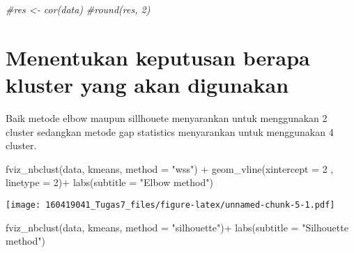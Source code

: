 \documentclass[
]{article}
\newenvironment{Shaded}{\begin{snugshade}}{\end{snugshade}}
\newcommand{\AttributeTok}[1]{\textcolor[rgb]{0.77,0.63,0.00}{#1}}
\newcommand{\CommentTok}[1]{\textcolor[rgb]{0.56,0.35,0.01}{\textit{#1}}}
\newcommand{\DecValTok}[1]{\textcolor[rgb]{0.00,0.00,0.81}{#1}}
\newcommand{\FunctionTok}[1]{\textcolor[rgb]{0.00,0.00,0.00}{#1}}
\newcommand{\NormalTok}[1]{#1}
\newcommand{\SpecialCharTok}[1]{\textcolor[rgb]{0.00,0.00,0.00}{#1}}
\newcommand{\StringTok}[1]{\textcolor[rgb]{0.31,0.60,0.02}{#1}}
\begin{document}
\begin{Shaded}
\begin{Highlighting}[]
\CommentTok{\#res \textless{}{-} cor(data)}
\CommentTok{\#round(res, 2)}
\end{Highlighting}
\end{Shaded}

\begin{Shaded}
\end{Shaded}

\hypertarget{menentukan-keputusan-berapa-kluster-yang-akan-digunakan}{%
\section{Menentukan keputusan berapa kluster yang akan
digunakan}\label{menentukan-keputusan-berapa-kluster-yang-akan-digunakan}}

Baik metode elbow maupun sillhouete menyarankan untuk menggunakan 2
cluster sedangkan metode gap statistics menyarankan untuk menggunakan 4
cluster.

\begin{Shaded}
\begin{Highlighting}[]
\FunctionTok{fviz\_nbclust}\NormalTok{(data, kmeans, }\AttributeTok{method =} \StringTok{"wss"}\NormalTok{) }\SpecialCharTok{+}
    \FunctionTok{geom\_vline}\NormalTok{(}\AttributeTok{xintercept =} \DecValTok{2}\NormalTok{ , }\AttributeTok{linetype =} \DecValTok{2}\NormalTok{)}\SpecialCharTok{+}
  \FunctionTok{labs}\NormalTok{(}\AttributeTok{subtitle =} \StringTok{"Elbow method"}\NormalTok{)}
\end{Highlighting}
\end{Shaded}

\texttt{[image: 160419041\_Tugas7\_files/figure-latex/unnamed-chunk-5-1.pdf]}

\begin{Shaded}
\begin{Highlighting}[]
\FunctionTok{fviz\_nbclust}\NormalTok{(data, kmeans, }\AttributeTok{method =} \StringTok{"silhouette"}\NormalTok{)}\SpecialCharTok{+}
  \FunctionTok{labs}\NormalTok{(}\AttributeTok{subtitle =} \StringTok{"Silhouette method"}\NormalTok{)}
\end{Highlighting}
\end{Shaded}
\end{document}
